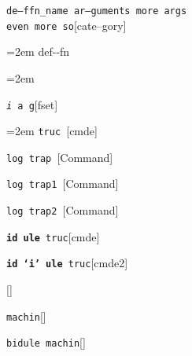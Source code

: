 \documentclass{book}
\begin{document}
\endgroup{}%
\noindent\texttt\bgroup{}de--ffn\_name ar--guments    more args \leavevmode{}\\ even more so\egroup{}\hfill[cate--gory]



%
\par\begingroup\obeylines\obeyspaces\frenchspacing\leftskip=2em\relax\parskip=0pt\relax\ttfamily{}%
def{-}{-}fn
\endgroup{}%
\par\begingroup\obeylines\obeyspaces\frenchspacing\leftskip=2em\relax\parskip=0pt\relax\ttfamily{}%

\endgroup{}%
\noindent\texttt\bgroup{}\emph{i} a g\egroup{}\hfill[fset]



%
\par\begingroup\obeylines\obeyspaces\frenchspacing\leftskip=2em\relax\parskip=0pt\relax\ttfamily{}%
%
\endgroup{}%
\noindent\texttt\bgroup{}truc \egroup{}\hfill[cmde]



%
\noindent\texttt\bgroup{}log trap \egroup{}\hfill[Command]



%
\noindent\texttt\bgroup{}log trap1 \egroup{}\hfill[Command]



%
\noindent\texttt\bgroup{}log trap2 \egroup{}\hfill[Command]



%
\noindent\texttt\bgroup{}\textbf{id ule} truc\egroup{}\hfill[cmde]



%
\noindent\texttt\bgroup{}\textbf{id `\texttt{i}' ule} truc\egroup{}\hfill[cmde2]



%
\noindent\texttt\bgroup{}\egroup{}\hfill[]



\noindent\texttt\bgroup{}machin\egroup{}\hfill[]



%
\noindent\texttt\bgroup{}bidule machin\egroup{}\hfill[]
\end{document}
